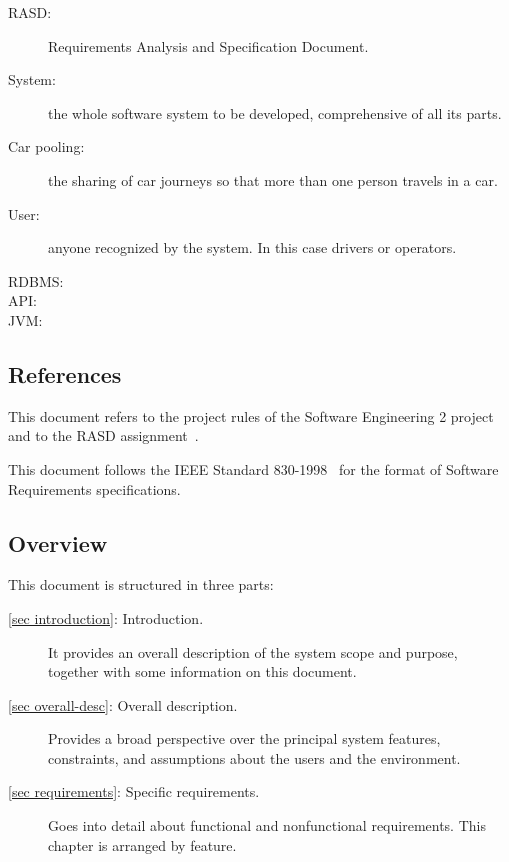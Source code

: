 \begin{description}
	\item[RASD:] Requirements Analysis and Specification Document.
	\item[System:] the whole software system to be developed, comprehensive of all its parts.
	\item[Car pooling:] the sharing of car journeys so that more than one person travels in a car.
	\item[User:] anyone recognized by the system. In this case drivers or operators.
	\item[RDBMS:]
	\item[API:]
	\item[JVM:] 
\end{description}

\subsection{References}
This document refers to the project rules of the Software Engineering 2 project~\cite{se-project-rules} and to the RASD assignment~\cite{se-assignment}.

This document follows the IEEE Standard 830-1998~\cite{ieee-830-1198} for the format of Software Requirements specifications.
\subsection{Overview}
This document is structured in three parts:
\begin{description}
	\item[\autoref{sec introduction}: Introduction.] It provides an overall description of the system scope and purpose, together with some information on this document.
	\item[\autoref{sec overall-desc}: Overall description.] Provides a broad perspective over the principal system features, constraints, and assumptions about the users and the environment.
	\item[\autoref{sec requirements}: Specific requirements.] Goes into detail about functional and nonfunctional requirements. This chapter is arranged by feature.
\end{description}

